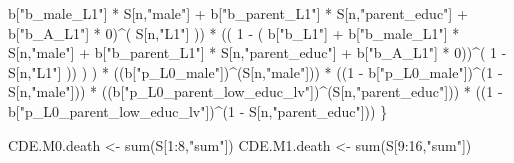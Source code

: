 \documentclass[
]{book}
\newenvironment{Shaded}{\begin{snugshade}}{\end{snugshade}}
\newcommand{\DecValTok}[1]{\textcolor[rgb]{0.00,0.00,0.81}{#1}}
\newcommand{\FunctionTok}[1]{\textcolor[rgb]{0.00,0.00,0.00}{#1}}
\newcommand{\NormalTok}[1]{#1}
\newcommand{\OtherTok}[1]{\textcolor[rgb]{0.56,0.35,0.01}{#1}}
\newcommand{\SpecialCharTok}[1]{\textcolor[rgb]{0.00,0.00,0.00}{#1}}
\newcommand{\StringTok}[1]{\textcolor[rgb]{0.31,0.60,0.02}{#1}}
\begin{document}
\begin{Shaded}
\begin{Highlighting}[]
\NormalTok{                           b[}\StringTok{"b\_male\_L1"}\NormalTok{] }\SpecialCharTok{*}\NormalTok{ S[n,}\StringTok{"male"}\NormalTok{] }\SpecialCharTok{+}  
\NormalTok{                           b[}\StringTok{"b\_parent\_L1"}\NormalTok{] }\SpecialCharTok{*}\NormalTok{ S[n,}\StringTok{"parent\_educ"}\NormalTok{] }\SpecialCharTok{+}
\NormalTok{                           b[}\StringTok{"b\_A\_L1"}\NormalTok{] }\SpecialCharTok{*} \DecValTok{0}\NormalTok{)}\SpecialCharTok{\^{}}\NormalTok{( S[n,}\StringTok{"L1"}\NormalTok{] )) }\SpecialCharTok{*}
\NormalTok{                      (( }\DecValTok{1} \SpecialCharTok{{-}}\NormalTok{ ( b[}\StringTok{"b\_L1"}\NormalTok{] }\SpecialCharTok{+}
\NormalTok{                                 b[}\StringTok{"b\_male\_L1"}\NormalTok{] }\SpecialCharTok{*}\NormalTok{ S[n,}\StringTok{"male"}\NormalTok{] }\SpecialCharTok{+}  
\NormalTok{                                 b[}\StringTok{"b\_parent\_L1"}\NormalTok{] }\SpecialCharTok{*}\NormalTok{ S[n,}\StringTok{"parent\_educ"}\NormalTok{] }\SpecialCharTok{+}
\NormalTok{                                 b[}\StringTok{"b\_A\_L1"}\NormalTok{] }\SpecialCharTok{*} \DecValTok{0}\NormalTok{))}\SpecialCharTok{\^{}}\NormalTok{( }\DecValTok{1} \SpecialCharTok{{-}}\NormalTok{ S[n,}\StringTok{"L1"}\NormalTok{] )) ) ) }\SpecialCharTok{*}
\NormalTok{      ((b[}\StringTok{"p\_L0\_male"}\NormalTok{])}\SpecialCharTok{\^{}}\NormalTok{(S[n,}\StringTok{"male"}\NormalTok{])) }\SpecialCharTok{*} 
\NormalTok{      ((}\DecValTok{1} \SpecialCharTok{{-}}\NormalTok{ b[}\StringTok{"p\_L0\_male"}\NormalTok{])}\SpecialCharTok{\^{}}\NormalTok{(}\DecValTok{1} \SpecialCharTok{{-}}\NormalTok{ S[n,}\StringTok{"male"}\NormalTok{])) }\SpecialCharTok{*} 
\NormalTok{      ((b[}\StringTok{"p\_L0\_parent\_low\_educ\_lv"}\NormalTok{])}\SpecialCharTok{\^{}}\NormalTok{(S[n,}\StringTok{"parent\_educ"}\NormalTok{])) }\SpecialCharTok{*}
\NormalTok{      ((}\DecValTok{1} \SpecialCharTok{{-}}\NormalTok{ b[}\StringTok{"p\_L0\_parent\_low\_educ\_lv"}\NormalTok{])}\SpecialCharTok{\^{}}\NormalTok{(}\DecValTok{1} \SpecialCharTok{{-}}\NormalTok{ S[n,}\StringTok{"parent\_educ"}\NormalTok{])) }
\NormalTok{    \}}
  
\NormalTok{  CDE.M0.death }\OtherTok{\textless{}{-}} \FunctionTok{sum}\NormalTok{(S[}\DecValTok{1}\SpecialCharTok{:}\DecValTok{8}\NormalTok{,}\StringTok{"sum"}\NormalTok{])}
\NormalTok{  CDE.M1.death }\OtherTok{\textless{}{-}} \FunctionTok{sum}\NormalTok{(S[}\DecValTok{9}\SpecialCharTok{:}\DecValTok{16}\NormalTok{,}\StringTok{"sum"}\NormalTok{])}
  

\end{Highlighting}
\end{Shaded}
\end{document}

